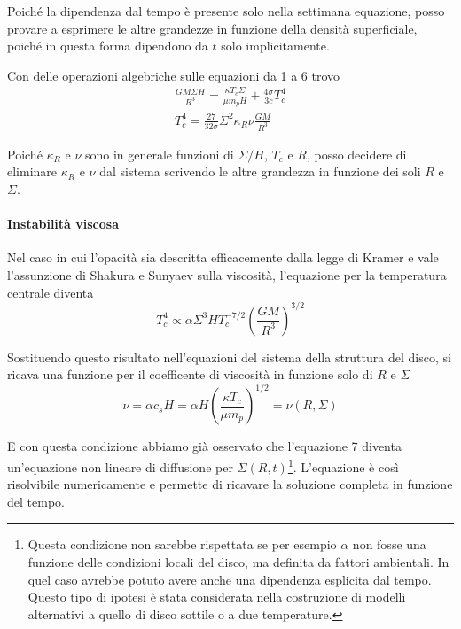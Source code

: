 \documentclass[a4paperbi]{article}
\begin{document}
	Poiché la dipendenza dal tempo è presente solo nella settimana equazione, posso provare a esprimere le altre grandezze in funzione della densità superficiale, poiché in questa forma dipendono da $t$ solo implicitamente.
	
	Con delle operazioni algebriche sulle equazioni da 1 a 6 trovo
	\begin{gather}
		\frac{GM\Sigma H}{R^3}=\frac{\kappa T_c\Sigma}{\mu m_p H}+\frac{4\sigma}{3c}T_c^4\\
		T^4_c=\frac{27}{32\sigma}\Sigma^2\kappa_R\nu\frac{GM}{R^3}
	\end{gather}
	
	Poiché $\kappa_R$ e $\nu$ sono in generale funzioni di $\Sigma/H$, $T_c$ e $R$, posso decidere di eliminare $\kappa_R$ e $\nu$ dal sistema scrivendo le altre grandezza in funzione dei soli $R$ e $\Sigma$.
		
	\paragraph{Instabilità viscosa}
	
	Nel caso in cui l'opacità sia descritta efficacemente dalla legge di Kramer e vale l'assunzione di Shakura e Sunyaev sulla viscosità, l'equazione per la temperatura centrale diventa
	\begin{equation*}
		T^4_c\propto\alpha\Sigma^3HT_c^{-7/2}\left(\frac{GM}{R^3}\right)^{3/2}
	\end{equation*}
	
	Sostituendo questo risultato nell'equazioni del sistema della struttura del disco, si ricava una funzione per il coefficente di viscosità in funzione solo di $R$ e $\Sigma$
	\begin{equation*}
		\nu=\alpha c_sH=\alpha H\left(\frac{\kappa T_c}{\mu m_p}\right)^{1/2}=\nu(R,\Sigma)
	\end{equation*}
	
	E con questa condizione abbiamo già osservato che l'equazione 7 diventa un'equazione non lineare di diffusione per $\Sigma(R,t)$\footnote{Questa condizione non sarebbe rispettata se per esempio $\alpha$ non fosse una funzione delle condizioni locali del disco, ma definita da fattori ambientali. In quel caso avrebbe potuto avere anche una dipendenza esplicita dal tempo. Questo tipo di ipotesi è stata considerata nella costruzione di modelli alternativi a quello di disco sottile o a due temperature.}. L'equazione è così risolvibile numericamente e permette di ricavare la soluzione completa in funzione del tempo.
\end{document}
